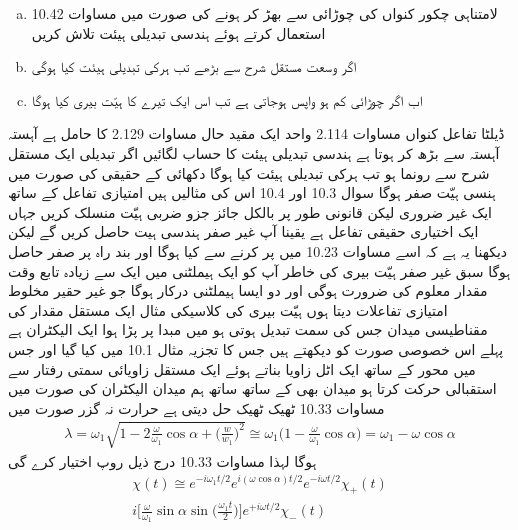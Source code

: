 \begin{enumerate}[a.]
\item
لامتناہی چکور کنواں کی چوڑائی   سے بھڑ کر  ہونے کی صورت میں مساوات 10.42 استعمال کرتے ہوئے ہندسی تبدیلی ہیئت تلاش کریں 
\item
اگر وسعت مستقل شرح  سے بڑھے تب ہرکی تبدیلی ہیئت کیا ہوگی 
\item
اب اگر چوڑائی کم ہو واپس  ہوجاتی ہے تب اس ایک تیرے کا ہیّت بیری کیا ہوگا 
\end{enumerate}
ڈیلٹا تفاعل کنواں مساوات 2.114 واحد ایک مقید حال مساوات 2.129 کا حامل ہے  آہستہ آہستہ  سے بڑھ کر  ہوتا ہے ہندسی تبدیلی ہیئت کا حساب لگائیں اگر تبدیلی ایک مستقل شرح  سے رونما ہو تب ہرکی تبدیلی ہیئت کیا ہوگا 
دکھائی کے حقیقی  کی صورت میں ہنسی ہیّت صفر ہوگا سوال 10.3 اور 10.4 اس کی مثالیں ہیں امتیازی تفاعل کے ساتھ ایک غیر ضروری لیکن قانونی طور پر بالکل جائز جزو ضربی ہیّت منسلک کریں  جہاں  ایک اختیاری حقیقی تفاعل ہے یقینا آپ غیر صفر ہندسی ہيت حاصل کریں گے لیکن دیکھنا یہ ہے کہ اسے مساوات 10.23 میں پر کرنے سے کیا ہوگا اور بند راہ پر صفر حاصل ہوگا سبق غیر صفر ہیّت بیری کی خاطر آپ کو ایک ہیملٹنی میں ایک سے زیادہ تابع وقت مقدار معلوم کی ضرورت ہوگی اور دو  ایسا ہیملٹنی درکار ہوگا جو غیر حقیر  مخلوط امتیازی تفاعلات دیتا ہوں 
ہیّت بیری کی کلاسیکی مثال ایک مستقل مقدار کی مقناطیسی میدان جس کی سمت تبدیل ہوتی ہو میں مبدا پر پڑا ہوا ایک الیکٹران ہے پہلے اس خصوصی صورت کو دیکھتے ہیں جس کا تجزیہ مثال 10.1 میں کیا گیا اور جس میں محور  کے ساتھ ایک اٹل زاویا  بناتے ہوئے  ایک مستقل زاویائی سمتی رفتار  سے استقبالی حرکت کرتا ہو میدان بھی کے ساتھ ساتھ ہم میدان الیکٹران کی صورت میں مساوات 10.33 ٹھیک ٹھیک حل دیتی ہے حرارت نہ گزر صورت  میں 
\begin{align}
\lambda = \omega_1 \sqrt{1 - 2 \frac{\omega}{\omega_1} \cos \alpha + \big ( \frac{w}{w_1} \big )^2 } \cong \omega_1 \big ( 1 - \frac{\omega}{\omega_1} \cos \alpha \big ) = \omega_1 - \omega \cos \alpha
\end{align}
ہوگا لہذا مساوات 10.33 درج ذیل روپ اختیار کرے گی 
\begin{multline}
\chi (t) \cong e^{- i \omega_1 t/2} e^{i (\omega \cos \alpha) t/2} e^{- i \omega t/2} \chi_+(t) \\
i \big [ \frac{\omega}{\omega_1} \sin \alpha \sin \big ( \frac{\omega_1 t}{2} \big ) \big ]e^{+ i \omega t/2} \chi_{-} (t)
\end{multline}
